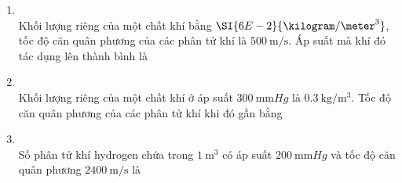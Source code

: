 \begin{enumerate}[label=\bfseries Câu \arabic*:, leftmargin=1.7cm]
\item {}\\
Khối lượng riêng của một chất khí bằng $\SI{6E-2}{\kilogram/\meter^3}$, tốc độ căn quân phương của các phân tử khí là $\SI{500}{\meter/\second}$. Áp suất mà khí đó tác dụng lên thành bình là

\item {}\\
Khối lượng riêng của một chất khí ở áp suất $\SI{300}{\milli\meter Hg}$ là $\SI{0.3}{\kilogram/\meter^3}$. Tốc độ căn quân phương của các phân tử khí khi đó gần bằng

\item {}\\
Số phân tử khí hydrogen chứa trong $\SI{1}{\meter^3}$ có áp suất $\SI{200}{\milli\meter Hg}$ và tốc độ căn quân phương $\SI{2400}{\meter/\second}$ là


\end{enumerate}
